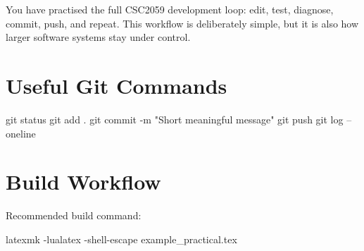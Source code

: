 \documentclass{csc2059practical}
\begin{document}
\begin{wrapupbox}
You have practised the full CSC2059 development loop: edit, test, diagnose, commit, push, and repeat. This workflow is deliberately simple, but it is also how larger software systems stay under control.
\end{wrapupbox}

\startappendices

\section{Useful Git Commands}

\begin{bashcode}
git status
git add .
git commit -m "Short meaningful message"
git push
git log --oneline
\end{bashcode}

\section{Build Workflow}

Recommended build command:

\begin{bashcode}
latexmk -lualatex -shell-escape example_practical.tex
\end{bashcode}
\end{document}
